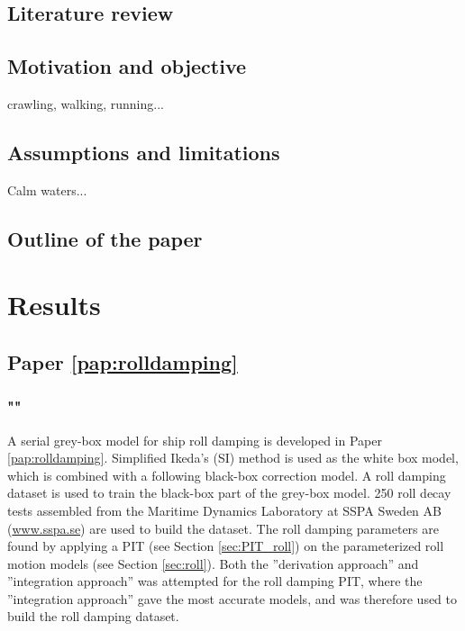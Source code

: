 \section{Literature review}


\section{Motivation and objective}

crawling, walking, running...

\section{Assumptions and limitations}
Calm waters...

\section{Outline of the paper}




\chapter{Results\label{ch:results}}

\section{Paper \ref{pap:rolldamping}}
\subsection*{""}
A serial grey-box model for ship roll damping is developed in Paper \ref{pap:rolldamping}. Simplified Ikeda's (SI) method \cite{kawahara_simple_2011} is used as the white box model, which is combined with a following black-box correction model.
A roll damping dataset is used to train the black-box part of the grey-box model.
250 roll decay tests assembled from the Maritime Dynamics Laboratory at SSPA Sweden AB (\href{www.sspa.se}{www.sspa.se}) are used to build the dataset. The roll damping parameters are found by applying a PIT (see Section \ref{sec:PIT_roll}) on the parameterized roll motion models (see Section \ref{sec:roll}).
Both the ''derivation approach'' and ''integration approach'' was attempted for the roll damping PIT, where the ''integration approach'' gave the most accurate models, and was therefore used to build the roll damping dataset.

